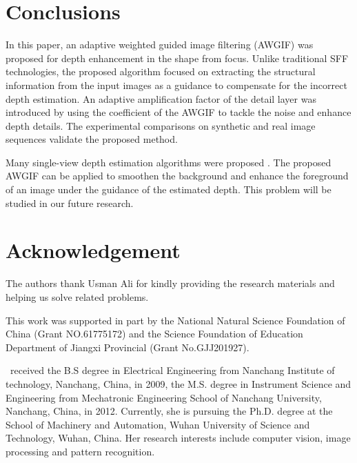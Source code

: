 \documentclass[a4paper,fleqn]{cas-dc}
\begin{document}
\section{Conclusions}\label{Conclusions}
In this paper, an adaptive weighted guided image filtering (AWGIF) was proposed for depth enhancement in the shape from focus. Unlike traditional SFF technologies, the proposed algorithm focused on extracting the structural information from the input images as a guidance to compensate for the incorrect depth estimation. An adaptive amplification factor of the detail layer was introduced by using the coefficient of the AWGIF to tackle the noise and enhance depth details. The experimental comparisons on synthetic and real image sequences validate the proposed method.

Many single-view depth estimation algorithms  were proposed \cite{1liz2018}. The proposed AWGIF can be applied to smoothen the background and enhance the foreground of an image \cite{1chenw2017} under the guidance of the estimated depth. This problem will be studied in our future research.

\section*{Acknowledgement}\label{cknowledgement}
The authors thank Usman Ali for kindly providing the research materials and helping us solve related problems.

This work was supported in part by the National Natural Science Foundation of China (Grant NO.61775172) and the Science Foundation of Education Department of Jiangxi Provincial (Grant No.GJJ201927).


















\printcredits





\vspace{1\baselineskip}
\par\noindent 
\parbox[t]{\linewidth}{
	 \ received the B.S degree in Electrical Engineering from Nanchang Institute of technology, Nanchang, China, in 2009, the M.S. degree in Instrument Science and Engineering from Mechatronic Engineering School of Nanchang University, Nanchang, China, in 2012. Currently, she is pursuing the Ph.D. degree at the School of Machinery and Automation, Wuhan University of Science and Technology, Wuhan, China. Her research interests include computer vision, image processing and pattern recognition.}
\vspace{1\baselineskip}
\end{document}
